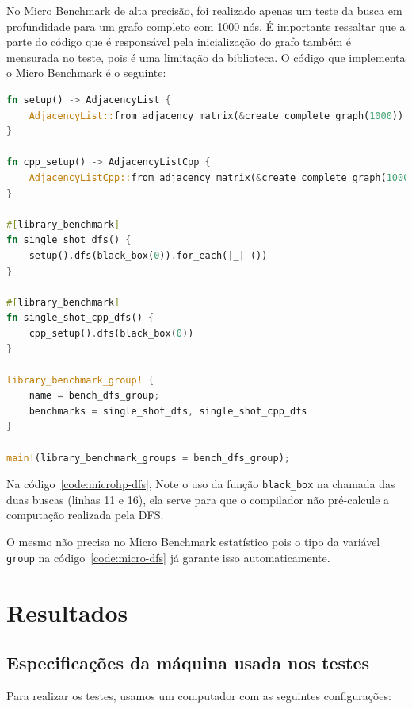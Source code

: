 No Micro Benchmark de alta precisão, foi realizado apenas um teste da busca em
profundidade para um grafo completo com 1000 nós. É importante
ressaltar que a parte do código que é responsável pela inicialização
do grafo também é mensurada no teste, pois é uma limitação da biblioteca.
O código que implementa o Micro Benchmark é o seguinte:

\begin{lstlisting}[language=Rust, label={code:microhp-dfs}, caption={Código dos testes de Micro Benchmark de alta precisão da implementação da DFS.}]
fn setup() -> AdjacencyList {
    AdjacencyList::from_adjacency_matrix(&create_complete_graph(1000))
}

fn cpp_setup() -> AdjacencyListCpp {
    AdjacencyListCpp::from_adjacency_matrix(&create_complete_graph(1000))
}

#[library_benchmark]
fn single_shot_dfs() {
    setup().dfs(black_box(0)).for_each(|_| ())
}

#[library_benchmark]
fn single_shot_cpp_dfs() {
    cpp_setup().dfs(black_box(0))
}

library_benchmark_group! {
    name = bench_dfs_group;
    benchmarks = single_shot_dfs, single_shot_cpp_dfs
}

main!(library_benchmark_groups = bench_dfs_group);
\end{lstlisting}

Na código~\ref{code:microhp-dfs}, Note o uso da função \texttt{black\_box} na
chamada das duas buscas (linhas 11 e 16), ela serve para que o
compilador não pré-calcule a computação realizada pela DFS.

O mesmo não precisa no Micro Benchmark estatístico pois o tipo da variável
\texttt{group} na código~\ref{code:micro-dfs} já garante isso automaticamente.

\section{Resultados}

\subsection{Especificações da máquina usada nos testes}

Para realizar os testes, usamos um computador com as seguintes
configurações:

